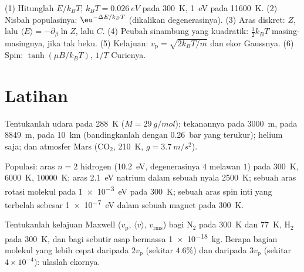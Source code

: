 \begin{method}\label{meth:b2:boltzmann-factor:method}
(1) Hitunglah $E/k_BT$; $k_BT = \qty{0.026}{eV}$ pada \qty{300}{K}, \qty{1}{eV}
pada \qty{11600}{K}. (2) Nisbah populasinya: $\eu^{-\Delta E/k_BT}$ (dikalikan
degenerasinya). (3) Aras diskret: $Z$, lalu $\langle E\rangle =
-\partial_\beta\ln Z$, lalu $C$. (4) Peubah sinambung yang kuadratik:
$\tfrac12k_BT$ masing-masingnya, jika tak beku. (5) Kelajuan: $v_{\text{p}} = \sqrt{2k_BT/m}$
dan ekor Gaussnya. (6) Spin: $\tanh(\mu B/k_BT)$, $1/T$ Curienya.
\end{method}

\section{Latihan}

\begin{exercise}[$\star$]\label{exo:b2:boltzmann-factor:1}
Tentukanlah  udara pada \qty{288}{K} ($M = \qty{29}{g/mol}$); tekanannya pada
\qty{3000}{m}, pada \qty{8849}{m}, pada \qty{10}{km} (bandingkanlah dengan \qty{0.26}{bar}
yang terukur);  helium saja; dan  atmosfer Mars
(CO$_2$, \qty{210}{K}, $g = \qty{3.7}{m/s^2}$).
\end{exercise}

\begin{exercise}[$\star$]\label{exo:b2:boltzmann-factor:2}
Populasi: aras $n = 2$ hidrogen (\qty{10.2}{eV}, degenerasinya $4$
melawan $1$) pada \qty{300}{K}, \qty{6000}{K}, \qty{10000}{K}; aras
\qty{2.1}{eV} natrium dalam sebuah nyala \qty{2500}{K}; sebuah aras rotasi molekul pada
\qty{1e-3}{eV} pada \qty{300}{K}; sebuah aras spin inti yang terbelah sebesar \qty{1e-7}{eV} dalam
sebuah magnet pada \qty{300}{K}.
\end{exercise}

\begin{exercise}[$\star$]\label{exo:b2:boltzmann-factor:3}
Tentukanlah kelajuan Maxwell ($v_{\text{p}}$, $\langle v\rangle$, $v_{\text{rms}}$) bagi N$_2$
pada \qty{300}{K} dan \qty{77}{K}, H$_2$ pada \qty{300}{K}, dan bagi sebutir asap
bermassa \qty{1e-18}{kg}. Berapa bagian molekul yang lebih cepat daripada $2v_{\text{p}}$
(sekitar $4.6\%$) dan daripada $3v_{\text{p}}$ (sekitar $4 \times 10^{-4}$): ulaslah
ekornya.
\end{exercise}

